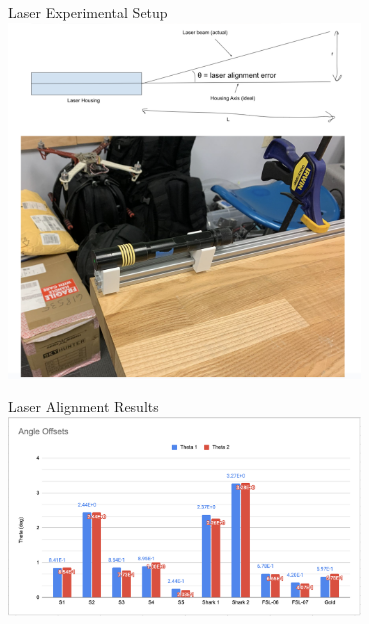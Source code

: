 \begin{frame}{Laser Experimental Setup}
    \centering
    \includegraphics[height=0.7\textheight,width=0.7\textwidth,keepaspectratio]{images/laser_alignment_experiment.png}
\end{frame}

\begin{frame}{Laser Alignment Results}
    \centering
    \includegraphics[height=0.7\textheight,width=0.7\textwidth,keepaspectratio]{images/laser_alignment_results.png}
\end{frame}